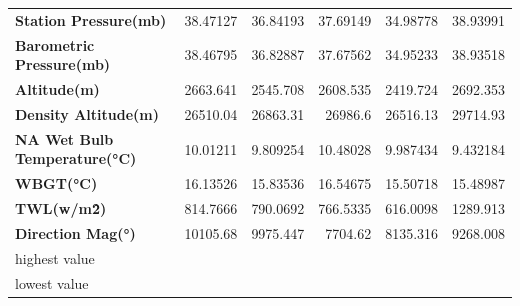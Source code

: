 \documentclass[a4paper]{article}
\begin{document}
\begin{table}[htbp]
\begin{tabular}{lrrrrr}
    \textbf{Station Pressure(mb)} & 38.47127 & 36.84193 & 37.69149 & \cellcolor[rgb]{ .608,  .804,  .608}34.98778 & \cellcolor[rgb]{ .98,  .502,  .447}38.93991 \\
    \textbf{Barometric Pressure(mb)} & 38.46795 & 36.82887 & 37.67562 & \cellcolor[rgb]{ .608,  .804,  .608}34.95233 & \cellcolor[rgb]{ .98,  .502,  .447}38.93518 \\
    \textbf{Altitude(m)} & 2663.641 & 2545.708 & 2608.535 & \cellcolor[rgb]{ .608,  .804,  .608}2419.724 & \cellcolor[rgb]{ .98,  .502,  .447}2692.353 \\
    \textbf{Density Altitude(m)} & \cellcolor[rgb]{ .608,  .804,  .608}26510.04 & 26863.31 & 26986.6 & 26516.13 & \cellcolor[rgb]{ .98,  .502,  .447}29714.93 \\
    \textbf{NA Wet Bulb Temperature(°C)} & 10.01211 & 9.809254 & 10.48028 & 9.987434 & \cellcolor[rgb]{ .608,  .804,  .608}9.432184 \\
    \textbf{WBGT(°C)} & 16.13526 & 15.83536 & 16.54675 & 15.50718 & \cellcolor[rgb]{ .608,  .804,  .608}15.48987 \\
    \textbf{TWL(w/m\^2)} & 814.7666 & 790.0692 & 766.5335 & \cellcolor[rgb]{ .608,  .804,  .608}616.0098 & \cellcolor[rgb]{ .98,  .502,  .447}1289.913 \\
    \textbf{Direction Mag(°)} & \cellcolor[rgb]{ .98,  .502,  .447}10105.68 & 9975.447 & \cellcolor[rgb]{ .608,  .804,  .608}7704.62 & 8135.316 & 9268.008 \\
    \midrule
    \rowcolor[rgb]{ .98,  .502,  .447} highest value & \cellcolor[rgb]{ 1,  1,  1} & \cellcolor[rgb]{ 1,  1,  1} & \cellcolor[rgb]{ 1,  1,  1} & \cellcolor[rgb]{ 1,  1,  1} & \cellcolor[rgb]{ 1,  1,  1} \\
    \rowcolor[rgb]{ .608,  .804,  .608} lowest value & \cellcolor[rgb]{ 1,  1,  1} & \cellcolor[rgb]{ 1,  1,  1} & \cellcolor[rgb]{ 1,  1,  1} & \cellcolor[rgb]{ 1,  1,  1} & \cellcolor[rgb]{ 1,  1,  1} \\
    \end{tabular}%
  \label{'tab:addlabel'}%
\end{table}%
\end{document}
